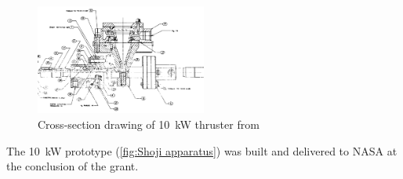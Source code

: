         \begin{figure}[!ht]
            \centering
            \includegraphics[width=0.5\textwidth]{assets/2 background/Shoji cross-section.png}
            \caption{Cross-section drawing of \qty{10}{kW} thruster from \textcite{shojiLaserheatedRocketThruster1977}}
            \label{fig:Shoji cross-section}
        \end{figure}

        The \qty{10}{kW} prototype (\autoref{fig:Shoji apparatus}) was built and delivered to NASA at the conclusion of the grant.

